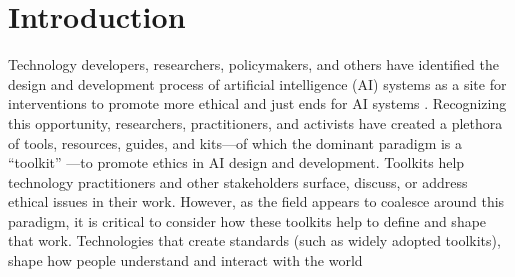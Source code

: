 \documentclass[acmsmall]{acmart}
\begin{document}
\section{Introduction}
\label{sec:intro}
Technology developers, researchers, policymakers, and others have identified the design and development process of artificial intelligence (AI) systems as a site for interventions to promote more ethical and just ends for AI systems \cite{Holstein:2019fr,madaio2020co,rakova2021responsible,schiff2020principles,madaio2022assessing}.
Recognizing this opportunity, researchers, practitioners, and activists have created a plethora of tools, resources, guides, and kits---of which the dominant paradigm is a ``toolkit'' \cite{lee2021landscape,richardson2021towards}---to promote ethics in AI design and development. Toolkits help technology practitioners and other stakeholders surface, discuss, or address ethical issues in their work. However, as the field appears to coalesce around this paradigm, it is critical to consider how these toolkits help to define and shape that work. Technologies that create standards (such as widely adopted toolkits), shape how people understand and interact with the world \cite{bowker1999sorting}
\end{document}
